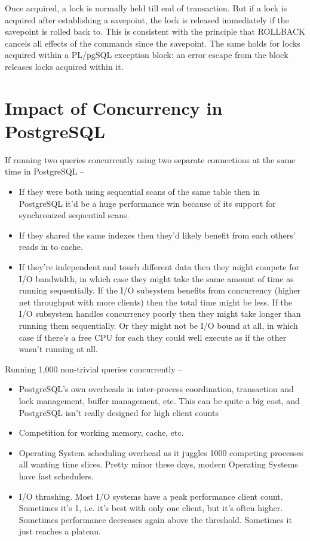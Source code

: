 \documentclass[paper=letter, fontsize=12pt]{article}
\newcommand*\tick{\item[\Checkmark]}
\newcommand*\fail{\item[\XSolidBrush]}
\begin{document}
Once acquired, a lock is normally held till end of transaction. But if a lock is acquired after establishing a savepoint, the lock is released immediately if the savepoint is rolled back to. This is consistent with the principle that ROLLBACK cancels all effects of the commands since the savepoint. The same holds for locks acquired within a PL/pgSQL exception block: an error escape from the block releases locks acquired within it.

\section{Impact of Concurrency in PostgreSQL}
If running two queries concurrently using two separate connections at the same time in PostgreSQL --
\begin{itemize}
	\tick If they were both using sequential scans of the same table then in PostgreSQL it'd be a huge performance win because of its support for synchronized sequential scans.
	\tick If they shared the same indexes then they'd likely benefit from each others' reads in to cache.
	\fail If they're independent and touch different data then they might compete for I/O bandwidth, in which case they might take the same amount of time as running sequentially. If the I/O subsystem benefits from concurrency (higher net throughput with more clients) then the total time might be less. If the I/O subsystem handles concurrency poorly then they might take longer than running them sequentially. Or they might not be I/O bound at all, in which case if there's a free CPU for each they could well execute as if the other wasn't running at all.
\end{itemize}
Running 1,000 non-trivial queries concurrently --
\begin{itemize}
	\item PostgreSQL's own overheads in inter-process coordination, transaction and lock management, buffer management, etc. This can be quite a big cost, and PostgreSQL isn't really designed for high client counts
	\item Competition for working memory, cache, etc.
	\item Operating System scheduling overhead as it juggles 1000 competing processes all wanting time slices. Pretty minor these days, modern Operating Systems have fast schedulers.
	\item I/O thrashing. Most I/O systems have a peak performance client count. Sometimes it's 1, i.e. it's best with only one client, but it's often higher. Sometimes performance decreases again above the threshold. Sometimes it just reaches a plateau.
\end{itemize}
\end{document}
